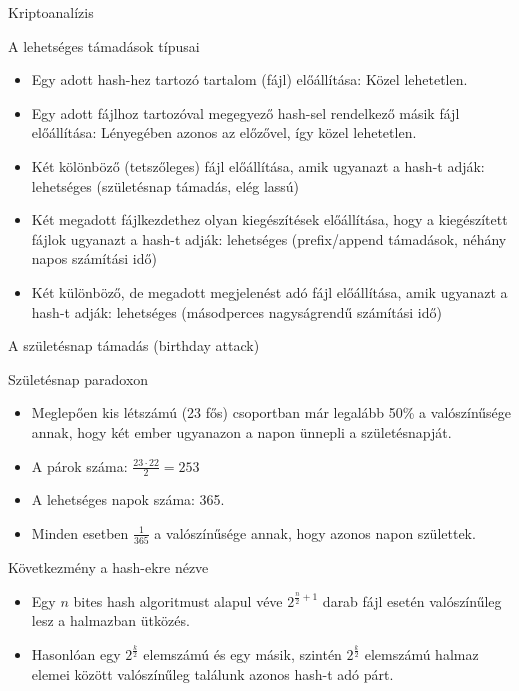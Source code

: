 \documentclass[12 pt]{beamer}
\begin{document}
\begin{frame}{Kriptoanalízis}
  \begin{block}{A lehetséges támadások típusai}
    \begin{itemize}
      \item{Egy adott hash-hez tartozó tartalom (fájl) előállítása: Közel lehetetlen.}
      \item{Egy adott fájlhoz tartozóval megegyező hash-sel rendelkező másik fájl előállítása: Lényegében azonos az előzővel, így közel lehetetlen.}
      \item{Két kölönböző (tetszőleges) fájl előállítása, amik ugyanazt a hash-t adják: lehetséges (születésnap támadás, elég lassú)}
      \item{Két megadott fájlkezdethez olyan kiegészítések előállítása, hogy a kiegészített fájlok ugyanazt a hash-t adják: lehetséges (prefix/append támadások, néhány napos számítási idő)}
      \item{Két különböző, de megadott megjelenést adó fájl előállítása, amik ugyanazt a hash-t adják: lehetséges (másodperces nagyságrendű számítási idő)}
    \end{itemize}
  \end{block}
\end{frame}

\begin{frame}{A születésnap támadás (birthday attack)}
  \begin{block}{Születésnap paradoxon}
    \begin{itemize}
      \item{Meglepően kis létszámú (23 fős) csoportban már legalább 50\% a valószínűsége annak, hogy két ember ugyanazon a napon ünnepli a születésnapját.}
      \item{A párok száma: $\frac{23 \cdot 22}{2} = 253$}
      \item{A lehetséges napok száma: 365.}
      \item{Minden esetben $\frac{1}{365}$ a valószínűsége annak, hogy azonos napon születtek.}
    \end{itemize}
  \end{block}

  \begin{block}{Következmény a hash-ekre nézve}
    \begin{itemize}
      \item{Egy $n$ bites hash algoritmust alapul véve $2^{\frac{n}{2}+1}$ darab fájl esetén valószínűleg lesz a halmazban ütközés.}
      \item{Hasonlóan egy $2^\frac{k}{2}$ elemszámú és egy másik, szintén $2^\frac{k}{2}$ elemszámú halmaz elemei között valószínűleg találunk azonos hash-t adó párt.}
    \end{itemize}
  \end{block}
\end{frame}
\end{document}
